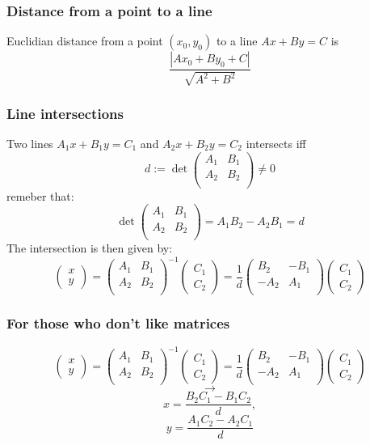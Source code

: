 \documentclass[pdf]{beamer}
\begin{document}
\begin{frame}
	\frametitle{Distance from a point to a line}
	Euclidian distance from a point $(x_0,y_0)$ to a line $Ax+By=C$ is
	$$\frac{|Ax_0+By_0+C|}{\sqrt{A^2+B^2}}$$
\end{frame}
\begin{frame}
	\frametitle{Line intersections}
	Two lines $A_1x+B_1y=C_1$ and $A_2x+B_2y=C_2$ intersects iff
	$$d := \det \begin{pmatrix}
	A_1 & B_1 \\
	A_2 & B_2 \\
	\end{pmatrix} \neq 0$$
	\pause remeber that:$$ \det \begin{pmatrix}
	A_1 & B_1 \\
	A_2 & B_2 \\
	\end{pmatrix} = A_1B_2 - A_2B_1 = d$$
	\pause
	The intersection is then given by:
	$$\begin{pmatrix}
	x\\
	y
	\end{pmatrix} = 
	\begin{pmatrix}
	A_1 & B_1 \\
	A_2 & B_2 \\
	\end{pmatrix}^{-1} 
	\begin{pmatrix}
	C_1 \\
	C_2
	\end{pmatrix}
	=
	\frac{1}{d}
	\begin{pmatrix}
	B_2 & -B_1 \\
	-A_2 & A_1 \\
	\end{pmatrix} 
	\begin{pmatrix}
	C_1 \\
	C_2
	\end{pmatrix}
	$$
\end{frame}

\begin{frame}
	\frametitle{For those who don't like matrices}
	$$\begin{pmatrix}
	x\\
	y
	\end{pmatrix} = 
	\begin{pmatrix}
	A_1 & B_1 \\
	A_2 & B_2 \\
	\end{pmatrix}^{-1} 
	\begin{pmatrix}
	C_1 \\
	C_2
	\end{pmatrix}
	=
	\frac{1}{d}
	\begin{pmatrix}
	B_2 & -B_1 \\
	-A_2 & A_1 \\
	\end{pmatrix} 
	\begin{pmatrix}
	C_1 \\
	C_2
	\end{pmatrix}
	$$
	$$\rightarrow$$
	$$x = \frac{B_2C_1-B_1C_2}{d},$$
	$$y = \frac{A_1C_2-A_2C_1}{d}$$
\end{frame}
\end{document}
